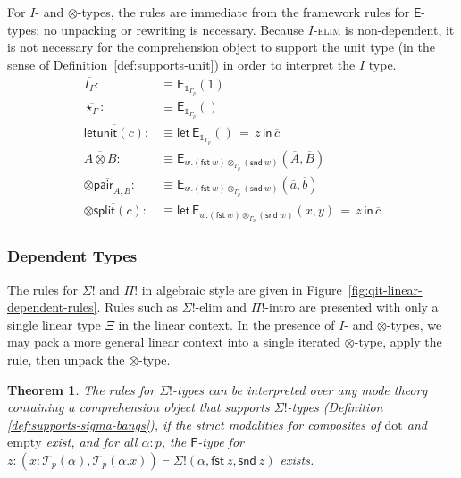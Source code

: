 \documentclass[10pt]{article}
\newtheorem{theorem}{Theorem}
\theoremstyle{definition}
\newcommand\dsd[1]{\ensuremath{\mathsf{#1}}}
\newcommand{\app}[2]{\ensuremath{#1 \: #2}}
\newcommand{\sigmacl}[3]{\ensuremath{(#1{:}#2,#3)}}
\newcommand{\fst}[1]{\app{\dsd{fst}}{#1}}
\newcommand{\snd}[1]{\app{\dsd{snd}}{#1}}
\newcommand\Esym{\ensuremath{\mathsf{E}}}
\newcommand\E[2]{\ensuremath{\mathsf{E}_{#1}(#2)}}
\newcommand\EEs[4]{\ensuremath{\mathsf{let} \, \mathsf{E}_{#1}(#3) \, = \, {#2} \, \mathsf{in} \, #4}}
\newcommand\EIs[2]{\ensuremath{\mathsf{E}_{#1}{(#2)}}}
\newcommand\El[2]{\mathcal{T}_{#1}(#2)}
\newcommand{\modeof}[1]{{#1}_p}
\newcommand{\sdot}{\ensuremath{\mathrm{dot}}}
\newcommand{\sempty}{\ensuremath{\mathrm{empty}}}
\newcommand{\upstairs}[1]{\overline{#1}}
\newcommand\One{\ensuremath{\mathds{1}}}
\newcommand\qunitmatch[1]{\ensuremath{\mathsf{letunit}(#1)}}
\newcommand\otimespair[1]{\ensuremath{\otimes\mathsf{pair}_{#1}}}
\newcommand\otimessplit[1]{\ensuremath{\otimes\mathsf{split}({#1})}}
\begin{document}
For $I$- and $\otimes$-types, the rules are immediate from the framework rules for $\Esym$-types; no unpacking or rewriting is necessary.    Because \textsc{$I$-elim} is non-dependent, it is not necessary for the comprehension object to support the unit type (in the sense of Definition~\ref{def:supports-unit}) in order to interpret the $I$ type.
\begin{align*}
\upstairs{I_\Gamma} :&\equiv \E{\One_{\modeof{\Gamma}}}{1} \\
\upstairs{\star_\Gamma} :&\equiv \EIs{\One_{\modeof{\Gamma}}}{} \\
\upstairs{\qunitmatch{c}} :&\equiv \EEs{\One_{\modeof{\Gamma}}}{z}{}{\upstairs{c}} \\
\upstairs{A \otimes B} :&\equiv \E{w. (\fst w) \otimes_{\modeof{\Gamma}} (\snd w)}{\upstairs{A}, \upstairs{B}} \\
\upstairs{\otimespair{A,B}} :&\equiv \EIs{w. (\fst w) \otimes_{\modeof{\Gamma}} (\snd w)}{\upstairs{a}, \upstairs{b}} \\
\upstairs{\otimessplit{c}} :&\equiv \EEs{w. (\fst w) \otimes_{\modeof{\Gamma}} (\snd w)}{z}{x, y}{\upstairs{c}}
\end{align*}

\subsubsection{Dependent Types}

The rules for $\Sigma!$ and $\Pi!$ in algebraic style are given in Figure~\ref{fig:qit-linear-dependent-rules}. Rules such as $\Sigma!$-elim and $\Pi!$-intro are presented with only a single linear type $\Xi$ in the linear context. In the presence of $I$- and $\otimes$-types, we may pack a more general linear context into a single iterated $\otimes$-type, apply the rule, then unpack the $\otimes$-type.

\begin{theorem}
The rules for $\Sigma!$-types can be interpreted over any mode theory
containing a comprehension object that supports $\Sigma!$-types
(Definition \ref{def:supports-sigma-bangs}),
if
the strict modalities for composites of $\sdot$ and $\sempty$ exist, and
for all $\alpha : p$,
the $\mathsf{F}$-type for $z : \sigmacl{x}{\El p \alpha}{\El p
  {\alpha.x}} \vdash \Sigma!(\alpha,\fst z, \snd z)$ exists.
\end{theorem}
\end{document}
